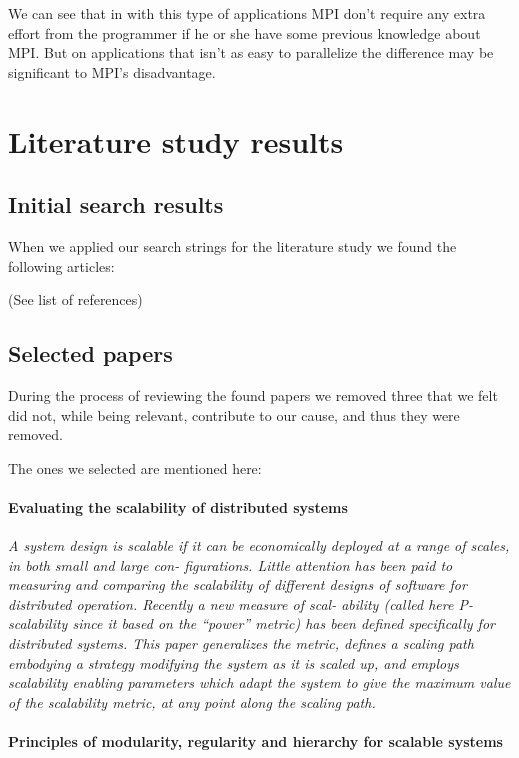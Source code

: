 \documentclass{article}
\begin{document}
We can see that in with this type of applications MPI don't require any extra
effort from the programmer if he or she have some previous knowledge about MPI.
But on applications that isn't as easy to parallelize the difference may be 
significant to MPI's disadvantage.

 
\section{Literature study results}

\subsection{Initial search results}
When we applied our search strings for the literature study we found the
following articles:

(See list of references)

\subsection{Selected papers}
During the process of reviewing the found papers we removed three that we felt
did not, while being relevant, contribute to our cause, and thus they were
removed. 

The ones we selected are mentioned here:

\paragraph{Evaluating the scalability of distributed systems}
\cite{jogalekar2000evaluating}

\emph{A system design is scalable if it can be economically deployed at a range
of scales, in both small and large con- figurations. Little attention has been
paid to measuring and comparing the scalability of different designs of
software for distributed operation. Recently a new measure of scal- ability
(called here P-scalability since it based on the “power” metric) has been
defined specifically for distributed systems. This paper generalizes the
metric, defines a scaling path embodying a strategy modifying the system as it
is scaled up, and employs scalability enabling parameters which adapt the
system to give the maximum value of the scalability metric, at any point along
the scaling path.}

\paragraph{Principles of modularity, regularity and hierarchy for scalable
systems} \cite{lipson2007principles}
\end{document}
